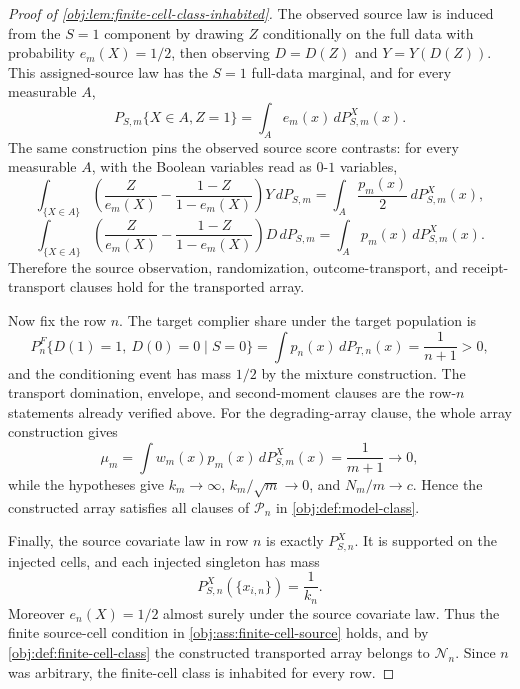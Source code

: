 \begin{proof}[Proof of \cref{obj:lem:finite-cell-class-inhabited}]
The observed source law is induced from the \(S=1\) component by drawing
\(Z\) conditionally on the full data with probability \(e_m(X)=1/2\), then
observing \(D=D(Z)\) and \(Y=Y(D(Z))\).  This assigned-source law has the
\(S=1\) full-data marginal, and for every measurable \(A\),
\[
P_{S,m}\{X\in A, Z=1\}
=
\int_A e_m(x)\,dP_{S,m}^X(x).
\]
The same construction pins the observed source score contrasts: for every
measurable \(A\), with the Boolean variables read as \(0\)-\(1\) variables,
\[
\int_{\{X\in A\}}
\left(\frac{Z}{e_m(X)}-\frac{1-Z}{1-e_m(X)}\right)Y\,dP_{S,m}
=
\int_A \frac{p_m(x)}2\,dP_{S,m}^X(x),
\]
\[
\int_{\{X\in A\}}
\left(\frac{Z}{e_m(X)}-\frac{1-Z}{1-e_m(X)}\right)D\,dP_{S,m}
=
\int_A p_m(x)\,dP_{S,m}^X(x).
\]
Therefore the source observation, randomization, outcome-transport, and
receipt-transport clauses hold for the transported array. %

Now fix the row \(n\).  The target complier share under the target population is
\[
P_n^F\{D(1)=1,\ D(0)=0\mid S=0\}
=
\int p_n(x)\,dP_{T,n}(x)
=
\frac1{n+1}
>
0,
\]
and the conditioning event has mass \(1/2\) by the mixture construction.  The
transport domination, envelope, and second-moment clauses are the row-\(n\)
statements already verified above.  For the degrading-array clause, the whole
array construction gives
\[
\mu_m
=
\int w_m(x)p_m(x)\,dP_{S,m}^X(x)
=
\frac1{m+1}
\longrightarrow0,
\]
while the hypotheses give \(k_m\to\infty\), \(k_m/\sqrt m\to0\), and
\(N_m/m\to c\).  Hence the constructed array satisfies all clauses of
\(\mathcal P_n\) in \cref{obj:def:model-class}. %

Finally, the source covariate law in row \(n\) is exactly \(P_{S,n}^X\).  It is
supported on the injected cells, and each injected singleton has mass
\[
P_{S,n}^X(\{x_{i,n}\})=\frac1{k_n}.
\]
Moreover \(e_n(X)=1/2\) almost surely under the source covariate law.  Thus the
finite source-cell condition in \cref{obj:ass:finite-cell-source} holds, and by
\cref{obj:def:finite-cell-class} the constructed transported array belongs to
\(\mathcal N_n\).  Since \(n\) was arbitrary, the finite-cell class is inhabited
for every row. %
\end{proof}
